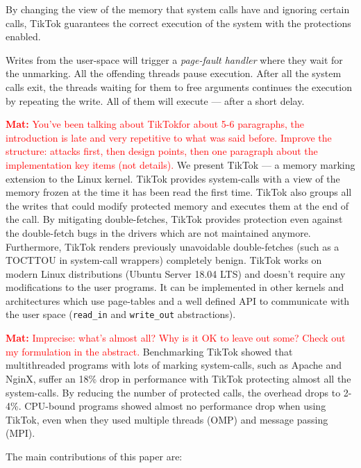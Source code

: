 \documentclass[conference]{IEEEtran}
\newcommand{\mat}[1]{\textcolor{red}{\textbf{Mat:} #1}}
\newcommand{\sysname}{TikTok}
\newcommand{\roughevaloverheadbad}{18\%}
\newcommand{\roughevaloverheadbetter}{2-4\%}
\begin{document}
By changing the view of the memory that system calls have and ignoring certain
calls, \sysname{} guarantees the correct execution of the system with the
protections enabled.

Writes from the user-space will trigger a \emph{page-fault handler} where they
wait for the unmarking. All the offending threads pause execution.
After all the system calls exit, the threads waiting for them to free arguments
continues the execution by repeating the write. All of them will execute 
--- after a short delay.

\mat{You've been talking about \sysname for about 5-6 paragraphs, the
introduction is late and very repetitive to what was said before. Improve the
structure: attacks first, then design points, then one paragraph about the
implementation key items (not details).}
We present \sysname{} --- a memory marking extension to the Linux kernel. \sysname{}
provides system-calls with a view of the memory frozen at the time it
has been read the first time. \sysname{} also groups all the writes that could
modify protected memory and executes them at the end of the call. By mitigating
double-fetches, \sysname{} provides protection even against the double-fetch bugs
in the drivers which are not maintained anymore. Furthermore, \sysname{}
renders previously unavoidable double-fetches (such as a TOCTTOU in
system-call wrappers) completely benign. \sysname{} works on modern
Linux distributions (Ubuntu Server 18.04 LTS) and doesn't require any
modifications to the user programs. It can be implemented in other kernels
and architectures which use page-tables and a well defined API to communicate
with the user space (\texttt{read\_in} and \texttt{write\_out} abstractions).

\mat{Imprecise: what's almost all? Why is it OK to leave out some? Check out my
formulation in the abstract.}
Benchmarking \sysname{} showed that multithreaded programs with lots of marking
system-calls, such as Apache and NginX, suffer an \roughevaloverheadbad{} drop in
performance with \sysname{} protecting almost all the system-calls. By reducing
the number of protected calls, the overhead drops to \roughevaloverheadbetter{}.
CPU-bound programs showed almost no performance drop when using \sysname{}, even
when they used multiple threads (OMP) and message passing (MPI).



The main contributions of this paper are:
\end{document}
